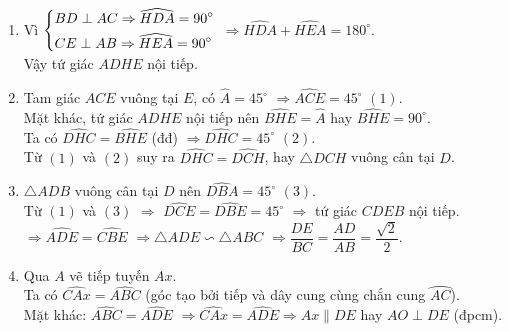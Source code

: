 \begin{ex}
{\begin{center}
\end{center}
\begin{enumerate}
\item Vì $\left\{\begin{aligned}&BD \perp AC \Rightarrow  \widehat{HDA}=90^\circ\\& CE \perp AB \Rightarrow \widehat{HEA}=90^\circ\end{aligned}\right.$ $\Rightarrow \widehat{HDA}+\widehat{HEA}=180^\circ$.\\
Vậy tứ giác $ADHE$ nội tiếp.
\item Tam giác $ACE$ vuông tại $E$, có $\widehat{A}=45^\circ$ $\Rightarrow \widehat{ACE}=45^\circ$ $(1)$.\\
Mặt khác, tứ giác $ADHE$ nội tiếp nên $\widehat{BHE}=\widehat{A}$ hay $\widehat{BHE}=90^\circ$.\\
Ta có $\widehat{DHC}=\widehat{BHE}$ (đđ) $\Rightarrow \widehat{DHC}=45^\circ$ $(2)$.\\
Từ $(1)$ và $(2)$ suy ra $ \widehat{DHC}= \widehat{DCH}$, hay $\triangle DCH$ vuông cân tại $D$.
\item $\triangle ADB$ vuông cân tại $D$ nên $\widehat{DBA}=45^\circ$ $(3)$.\\
Từ $(1)$ và $(3)$ $\Rightarrow$ $\widehat{DCE}=\widehat{DBE}=45^\circ$ $\Rightarrow$ tứ giác $CDEB$ nội tiếp.\\
$\Rightarrow \widehat{ADE}=\widehat{CBE}$ $\Rightarrow \triangle ADE \backsim \triangle ABC$ $\Rightarrow \dfrac{DE}{BC}=\dfrac{AD}{AB}=\dfrac{\sqrt{2}}{2}$.
\item Qua $A$ vẽ tiếp tuyến $Ax$.\\
Ta có $\widehat{CAx}=\widehat{ABC}$ (góc tạo bởi tiếp và dây cung cùng chắn cung $\wideparen{AC}$).\\
Mặt khác: $\widehat{ABC}=\widehat{ADE}$ $\Rightarrow \widehat{CAx}=\widehat{ADE} \Rightarrow Ax \parallel DE$ hay $AO \perp DE$ (đpcm).
\end{enumerate}
}
\end{ex}
